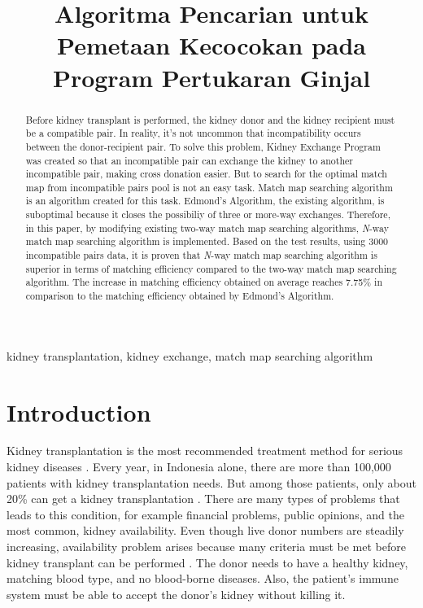 \documentclass[conference]{IEEEtran}
\begin{document}
\title{Algoritma Pencarian untuk Pemetaan Kecocokan pada Program Pertukaran Ginjal}

\author{
\and
{}
\and
{}
}

\maketitle

\begin{abstract}
Before kidney transplant is performed, the kidney donor and the kidney recipient must
be a compatible pair. In reality, it's not uncommon that incompatibility occurs between the donor-recipient pair.
To solve this problem, Kidney Exchange Program was created so that an incompatible pair can exchange the kidney
to another incompatible pair, making cross donation easier. But to search for the optimal match map from incompatible
pairs pool is not an easy task. Match map searching algorithm is an algorithm created for this task. Edmond's
Algorithm, the existing algorithm, is suboptimal because it closes the possibiliy of three or more-way exchanges.
Therefore, in this paper, by modifying existing two-way match map searching algorithms, \textit{N}-way match
map searching algorithm is implemented. Based on the test results, using 3000 incompatible pairs data, it is
proven that \textit{N}-way match map searching algorithm is superior in terms of matching efficiency compared to
the two-way match map searching algorithm. The increase in matching efficiency obtained on average reaches 7.75\%
in comparison to the matching efficiency obtained by Edmond's Algorithm. 
\end{abstract}

\begin{IEEEkeywords}
kidney transplantation, kidney exchange, match map searching algorithm
\end{IEEEkeywords}

\section{Introduction}
Kidney transplantation is the most recommended treatment method for serious kidney diseases \cite{roth2005}.
Every year, in Indonesia alone, there are more than 100,000 patients with kidney transplantation needs. But among
those patients, only about 20\% can get a kidney transplantation \cite{wiradarma}. There are many types
of problems that leads to this condition, for example financial problems, public opinions, and the most
common, kidney availability.
Even though live donor numbers are steadily increasing\cite{roth2006}, availability problem arises because many criteria must
be met before kidney transplant can be performed \cite{wiradarma}. The donor needs to have a healthy kidney,
matching blood type, and no blood-borne diseases. Also, the patient's immune system must be able to accept
the donor's kidney without killing it.
\end{document}
